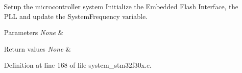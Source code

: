 Setup the microcontroller system Initialize the Embedded Flash Interface, the P\-L\-L and update the System\-Frequency variable. 


\begin{DoxyParams}{Parameters}
{\em None} & \\
\hline
\end{DoxyParams}

\begin{DoxyRetVals}{Return values}
{\em None} & \\
\hline
\end{DoxyRetVals}


Definition at line 168 of file system\-\_\-stm32f30x.\-c.

